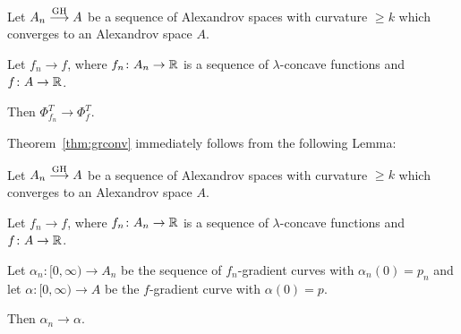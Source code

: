 \documentclass{amsart}
\begin{document}
\begin{thm}\label{thm:grconv}
Let $A_n \GHto A$
be a sequence of Alexandrov spaces with curvature $\ge k$
which converges to an Alexandrov space $A$.

Let $f_n\to f$, where $f_n\colon A_n\to {\Bbb R}$ is a sequence of $\lambda$-concave functions and $f\colon A\to {\Bbb R}$.

Then  $\Phi_{f_n}^T\to\Phi_f^T$.

\end{thm}

Theorem~\ref{thm:grconv}  immediately follows  from the following Lemma:

\begin{lem}Let $A_n \GHto A$
be a sequence of Alexandrov spaces with curvature $\ge k$
which converges to an Alexandrov space $A$.

Let $f_n\to f$, where $f_n\colon A_n\to {\Bbb R}$ is a sequence of $\lambda$-concave functions and $f\colon A\to {\Bbb R}$.

Let $\alpha_n\colon  [0,\infty) \to A_n$ be the sequence of
$f_n$-gradient curves with $\alpha_n(0)=p_n$ and
let $\alpha\colon  [0,\infty) \to A$ be the $f$-gradient curve with $\alpha(0)=p$.

Then $\alpha_n\to\alpha$.
\end{lem}
\end{document}

